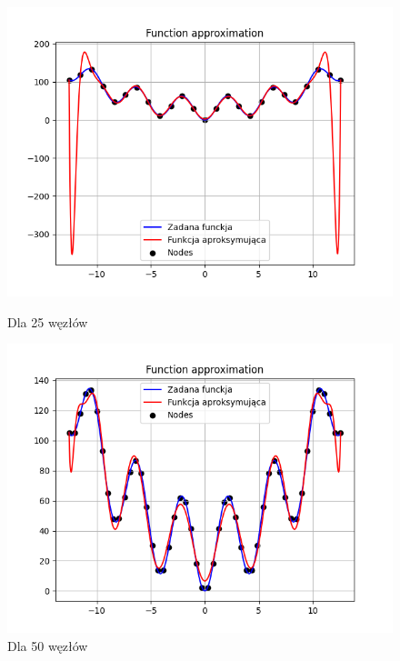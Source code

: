 \documentclass{article}
\begin{document}
\begin{figure}[H]
  \begin{minipage}[b]{0.49\textwidth}
    \begin{minipage}[b]{\textwidth}
      \includegraphics[width=\textwidth]{img33.png}
      \caption{Dla 25 węzłów}
    \end{minipage}
    \vspace*{\fill}
    \begin{minipage}[b]{\textwidth}
      \includegraphics[width=\textwidth]{img34.png}
      \caption{Dla 50 węzłów}
    \end{minipage}
  \end{minipage}
  \hfill
  \begin{minipage}[b]{0.49\textwidth}

\end{minipage}
\end{figure}
\end{document}
